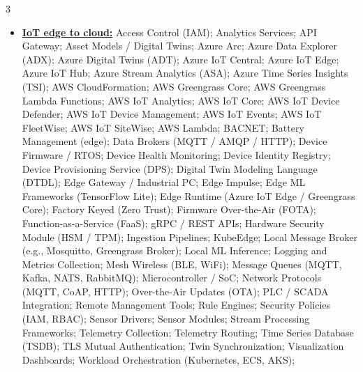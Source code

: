 \documentclass[letterpaper,11pt]{article}
\begin{document}
\begin{multicols}{3}
{\begin{itemize}[leftmargin=0.1in, label={}, itemsep=0pt, parsep=0pt, topsep=0pt, partopsep=0pt]
                \item
                \textbf{\uline{IoT edge to cloud:}} \hspace{0pt}
                Access Control (IAM);
                Analytics Services;
                API Gateway;
                Asset Models / Digital Twins;
                Azure Arc;
                Azure Data Explorer (ADX);
                Azure Digital Twins (ADT);
                Azure IoT Central;
                Azure IoT Edge;
                Azure IoT Hub;
                Azure Stream Analytics (ASA);
                Azure Time Series Insights (TSI);
                AWS CloudFormation;
                AWS Greengrass Core;
                AWS Greengrass Lambda Functions;
                AWS IoT Analytics;
                AWS IoT Core;
                AWS IoT Device Defender;
                AWS IoT Device Management;
                AWS IoT Events;
                AWS IoT FleetWise;
                AWS IoT SiteWise;
                AWS Lambda;
                BACNET;
                Battery Management (edge);
                Data Brokers (MQTT / AMQP / HTTP);
                Device Firmware / RTOS;
                Device Health Monitoring;
                Device Identity Registry;
                Device Provisioning Service (DPS);
                Digital Twin Modeling Language (DTDL);
                Edge Gateway / Industrial PC;
                Edge Impulse;
                Edge ML Frameworks (TensorFlow Lite);
                Edge Runtime (Azure IoT Edge / Greengrass Core);
                Factory Keyed (Zero Trust);
                Firmware Over-the-Air (FOTA);
                Function-as-a-Service (FaaS);
                gRPC / REST APIs;
                Hardware Security Module (HSM / TPM);
                Ingestion Pipelines;
                KubeEdge;
                Local Message Broker (e.g., Mosquitto, Greengrass Broker);
                Local ML Inference;
                Logging and Metrics Collection;
                Mesh Wireless (BLE, WiFi);
                Message Queues (MQTT, Kafka, NATS, RabbitMQ);
                Microcontroller / SoC;
                Network Protocols (MQTT, CoAP, HTTP);
                Over-the-Air Updates (OTA);
                PLC / SCADA Integration;
                Remote Management Tools;
                Rule Engines;
                Security Policies (IAM, RBAC);
                Sensor Drivers;
                Sensor Modules;
                Stream Processing Frameworks;
                Telemetry Collection;
                Telemetry Routing;
                Time Series Database (TSDB);
                TLS Mutual Authentication;
                Twin Synchronization;
                Visualization Dashboards;
                Workload Orchestration (Kubernetes, ECS, AKS);
            \end{itemize}
        }
    \end{multicols}
\end{document}
